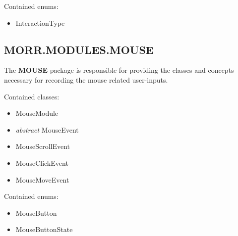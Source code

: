 Contained enums:
\begin{itemize}
\item InteractionType
\end{itemize}

\newpage
\subsection*{MORR.MODULES.MOUSE}

The \textbf{MOUSE} package is responsible for providing the classes and concepts necessary for recording the mouse related user-inputs.

Contained classes:
\begin{itemize}
\item MouseModule
\item \textit{abstract} MouseEvent
\item MouseScrollEvent
\item MouseClickEvent
\item MouseMoveEvent
\end{itemize}

Contained enums:
\begin{itemize}
\item MouseButton
\item MouseButtonState
\end{itemize}
